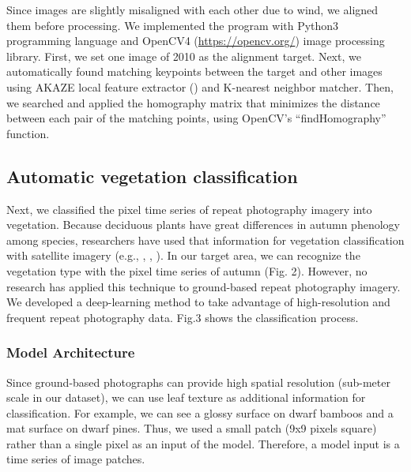 \documentclass{article}
\begin{document}
Since images are slightly misaligned with each other due to wind, we aligned them before processing. We implemented the program with Python3 programming language and OpenCV4 (\url{https://opencv.org/}) image processing library. First, we set one image of 2010 as the alignment target. Next, we automatically found matching keypoints between the target and other images using AKAZE local feature extractor (\cite{Alcantarilla2013AKAZE}) and K-nearest neighbor matcher. Then, we searched and applied the homography matrix that minimizes the distance between each pair of the matching points, using OpenCV's ``findHomography'' function.

\hypertarget{automatic-vegetation-classification}{%
\subsection{Automatic vegetation classification}\label{automatic-vegetation-classification}}

Next, we classified the pixel time series of repeat photography imagery into vegetation. Because deciduous plants have great differences in autumn phenology among species, researchers have used that information for vegetation classification with satellite imagery (e.g., \cite{Tigges2013RemSenEnv}, \cite{Son2013RemSen}, \cite{Heupel2018PFG}). In our target area, we can recognize the vegetation type with the pixel time series of autumn (Fig. 2). However, no research has applied this technique to ground-based repeat photography imagery. We developed a deep-learning method to take advantage of high-resolution and frequent repeat photography data. Fig.3 shows the classification process.

\hypertarget{model-architecture}{%
\subsubsection{Model Architecture}\label{model-architecture}}

Since ground-based photographs can provide high spatial resolution (sub-meter scale in our dataset), we can use leaf texture as additional information for classification. For example, we can see a glossy surface on dwarf bamboos and a mat surface on dwarf pines. Thus, we used a small patch (9x9 pixels square) rather than a single pixel as an input of the model. Therefore, a model input is a time series of image patches.
\end{document}
